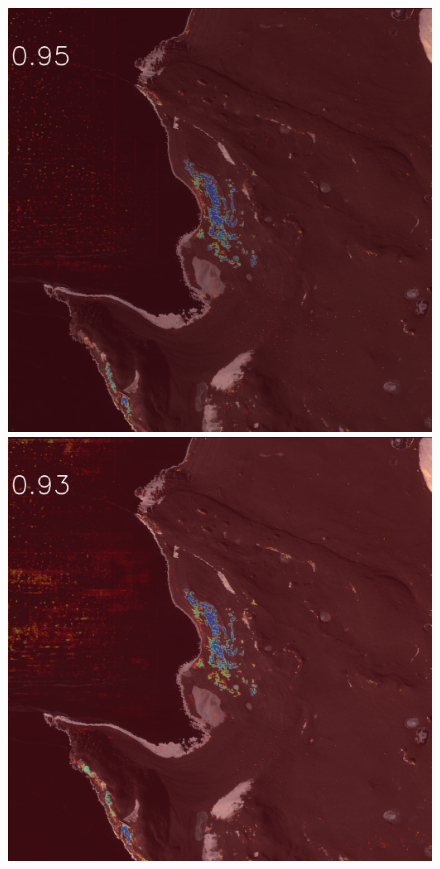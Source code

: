 \begin{figure}[h]
\includegraphics[width=\subFigx]{./fig/datagrow/MSE_single_unet_train_1_3.txt_bias-1_bs128_do0.1e25/2.png}
\includegraphics[width=\subFigx]{./fig/datagrow/MSE_single_unet_train_1_4.txt_bias-1_bs128_do0.1e25/2.png}


\end{figure}
